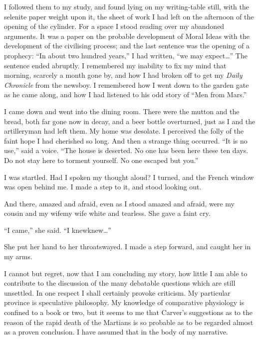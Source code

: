 I followed them to my study, and found lying on my writing-table
still, with the selenite paper weight upon it, the sheet of work I
had left on the afternoon of the opening of the cylinder. For a
space I stood reading over my abandoned arguments. It was a paper
on the probable development of Moral Ideas with the development of
the civilising process; and the last sentence was the opening of a
prophecy: ``In about two hundred years,'' I had written, ``we may
expect\ldots{}'' The sentence ended abruptly. I remembered my inability
to fix my mind that morning, scarcely a month gone by, and how I
had broken off to get my \emph{Daily Chronicle} from the newsboy. I
remembered how I went down to the garden gate as he came along, and
how I had listened to his odd story of ``Men from Mars.''

I came down and went into the dining room. There were the mutton
and the bread, both far gone now in decay, and a beer bottle
overturned, just as I and the artilleryman had left them. My home
was desolate. I perceived the folly of the faint hope I had
cherished so long. And then a strange thing occurred. ``It is no
use,'' said a voice. ``The house is deserted. No one has been here
these ten days. Do not stay here to torment yourself. No one
escaped but you.''

I was startled. Had I spoken my thought aloud? I turned, and the
French window was open behind me. I made a step to it, and stood
looking out.

And there, amazed and afraid, even as I stood amazed and afraid,
were my cousin and my wife\dash{}my wife white and tearless. She gave a
faint cry.

``I came,'' she said. ``I knew\dash{}knew\ldots{}''

She put her hand to her throat\dash{}swayed. I made a step forward, and
caught her in my arms.

I cannot but regret, now that I am concluding my story, how little
I am able to contribute to the discussion of the many debatable
questions which are still unsettled. In one respect I shall
certainly provoke criticism. My particular province is speculative
philosophy. My knowledge of comparative physiology is confined to a
book or two, but it seems to me that Carver's suggestions as to the
reason of the rapid death of the Martians is so probable as to be
regarded almost as a proven conclusion. I have assumed that in the
body of my narrative.

